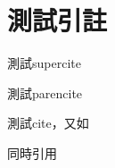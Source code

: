 \section{測試引註}

測試supercite\supercite{Mackay:2012}

測試parencite\parencite{行政契約2013}

測試cite\cite{biber}，又如\cite[文獻][第 10 頁]{biber}

同時引用\cite{usdsbook, obama}

\nocite{*}
